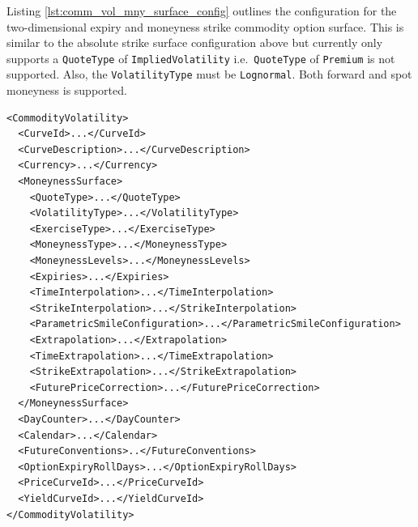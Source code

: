 Listing \ref{lst:comm_vol_mny_surface_config} outlines the configuration for the two-dimensional expiry and moneyness strike commodity option surface. This is similar to the absolute strike surface configuration above but currently only supports a \lstinline!QuoteType! of \lstinline!ImpliedVolatility! i.e.\ \lstinline!QuoteType! of \lstinline!Premium! is not supported. Also, the \lstinline!VolatilityType! must be \lstinline!Lognormal!. Both forward and spot moneyness is supported.

\begin{longlisting}
\begin{verbatim}
<CommodityVolatility>
  <CurveId>...</CurveId>
  <CurveDescription>...</CurveDescription>
  <Currency>...</Currency>
  <MoneynessSurface>
    <QuoteType>...</QuoteType>
    <VolatilityType>...</VolatilityType>
    <ExerciseType>...</ExerciseType>
    <MoneynessType>...</MoneynessType>
    <MoneynessLevels>...</MoneynessLevels>
    <Expiries>...</Expiries>
    <TimeInterpolation>...</TimeInterpolation>
    <StrikeInterpolation>...</StrikeInterpolation>
    <ParametricSmileConfiguration>...</ParametricSmileConfiguration>
    <Extrapolation>...</Extrapolation>
    <TimeExtrapolation>...</TimeExtrapolation>
    <StrikeExtrapolation>...</StrikeExtrapolation>
    <FuturePriceCorrection>...</FuturePriceCorrection>
  </MoneynessSurface>
  <DayCounter>...</DayCounter>
  <Calendar>...</Calendar>
  <FutureConventions>..</FutureConventions>
  <OptionExpiryRollDays>...</OptionExpiryRollDays>
  <PriceCurveId>...</PriceCurveId>
  <YieldCurveId>...</YieldCurveId>
</CommodityVolatility>
\end{verbatim}
\caption{Expiry and moneyness strike commodity option surface configuration}
\label{lst:comm_vol_mny_surface_config}
\end{longlisting}

